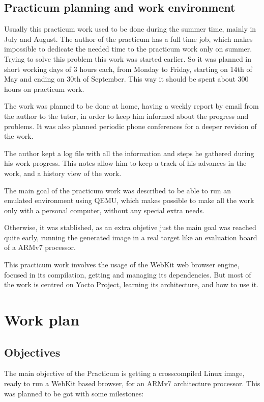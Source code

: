\documentclass[a4paper,11pt,openany]{report}
\begin{document}
\section{Practicum planning and work environment}
Usually this practicum work used to be done during the summer time, mainly in July and August. The author of the practicum has a full time job, which makes impossible to dedicate the needed time to the practicum work only on summer. Trying to solve this problem this work was started earlier. So it was planned in short working days of 3 hours each, from Monday to Friday, starting on 14th of May and ending on 30th of September. This way it should be spent about 300 hours on practicum work.

The work was planned to be done at home, having a weekly report by email from the author to the tutor, in order to keep him informed about the progress and problems. It was also planned periodic phone conferences for a deeper revision of the work.

The author kept a log file with all the information and steps he gathered during his work progress. This notes allow him to keep a track of his advances in the work, and a history view of the work.

The main goal of the practicum work was described to be able to run an emulated environment using QEMU, which makes possible to make all the work only with a personal computer, without any special extra needs.

Otherwise, it was stablished, as an extra objetive just the main goal was reached quite early, running the generated image in a real target like an evaluation board of a ARMv7 processor.

This practicum work involves the usage of the WebKit web browser engine, focused in its compilation, getting and managing its dependencies. But most of the work is centred on Yocto Project, learning its architecture, and how to use it.

\chapter{Work plan}

\section{Objectives}
The main objective of the Practicum is getting a crosscompiled Linux image, ready to run a WebKit based browser, for an ARMv7 architecture processor. This was planned to be got with some milestones:
\end{document}
